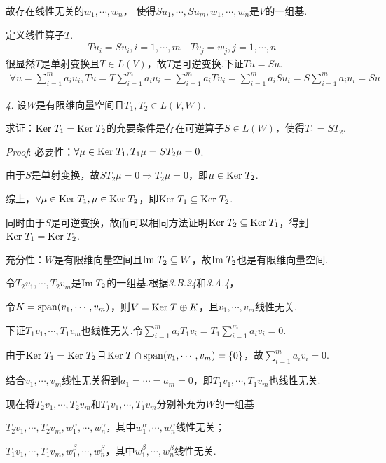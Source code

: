 故存在线性无关的$w_1,\cdots,w_n$， 使得$Su_1,\cdots,Su_m,w_1,\cdots,w_n$是$V$的一组基.

定义线性算子$T$.
    \begin{align*}
        Tu_i=Su_i,i=1,\cdots,m \quad Tv_j=w_j,j=1,\cdots,n
    \end{align*}
很显然$T$是单射变换且$T \in L(V)$，故$T$是可逆变换.下证$Tu=Su$.
    \begin{align*}
        \forall u=\sum_{i=1}^m a_iu_i,Tu=T\sum_{i=1}^m a_iu_i
        =\sum_{i=1}^m a_iTu_i=\sum_{i=1}^m a_iSu_i=S\sum_{i=1}^m a_iu_i=Su
    \end{align*}

\newpage

\textit{4.}
设$W$是有限维向量空间且$T_1,T_2 \in L(V,W)$.

求证：$\mathrm{Ker \;} T_1=\mathrm{Ker \;} T_2$的充要条件是存在可逆算子$S \in L(W)$，使得$T_1=ST_2$.

\textit{Proof}:
必要性：$\forall \mu \in \mathrm{Ker \;} T_1,T_1 \mu=ST_2 \mu =0$.

由于$S$是单射变换，故$ST_2 \mu =0 \Rightarrow T_2 \mu =0$，即$\mu \in \mathrm{Ker \;} T_2$.

综上，$\forall \mu \in \mathrm{Ker \;} T_1, \mu \in \mathrm{Ker \;} T_2$，即$\mathrm{Ker \;} T_1 \subseteq \mathrm{Ker \;} T_2$.

同时由于$S$是可逆变换，故而可以相同方法证明$\mathrm{Ker \;} T_2 \subseteq \mathrm{Ker \;} T_1$，得到$\mathrm{Ker \;} T_1=\mathrm{Ker \;} T_2$.

充分性：$W$是有限维向量空间且$\mathrm{Im \;} T_2 \subseteq W$，故$\mathrm{Im \;} T_2$也是有限维向量空间.

令$T_2v_1,\cdots,T_2v_m$是$\mathrm{Im \;} T_2$的一组基.根据\textit{3.B.24}和\textit{3.A.4}，

令$K=\mathrm{span} (v_1,\cdots,v_m)$，则$V=\mathrm{Ker \;} T \oplus K$，且$v_1,\cdots,v_m$线性无关.

下证$T_1v_1,\cdots,T_1v_m$也线性无关.令$\sum_{i=1}^m a_iT_1v_i=T_1\sum_{i=1}^m a_iv_i=0$.

由于$\mathrm{Ker \;} T_1=\mathrm{Ker \;} T_2$且$\mathrm{Ker \;} T \cap \mathrm{span} (v_1,\cdots,v_m)=\{0\}$，故$\sum_{i=1}^m a_iv_i=0$.

结合$v_1,\cdots,v_m$线性无关得到$a_1=\cdots=a_m=0$，即$T_1v_1,\cdots,T_1v_m$也线性无关.

现在将$T_2v_1,\cdots,T_2v_m$和$T_1v_1,\cdots,T_1v_m$分别补充为$W$的一组基

$T_2v_1,\cdots,T_2v_m,w_1^\alpha,\cdots,w_n^\alpha$，其中$w_1^\alpha,\cdots,w_n^\alpha$线性无关；

$T_1v_1,\cdots,T_1v_m,w_1^\beta,\cdots,w_n^\beta$，其中$w_1^\beta,\cdots,w_n^\beta$线性无关.

